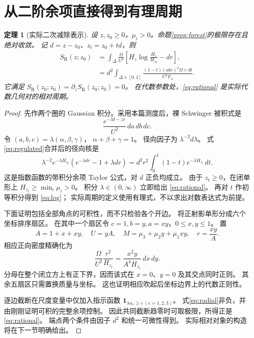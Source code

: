 \documentclass[11pt,a4paper]{ctexart}
\theoremstyle{cnplain}
\newtheorem{theorem}{定理}[section]
\theoremstyle{remark}\newtheorem{remark}[theorem]{注}
\newcommand{\SR}{S_{\mathrm R}}
\begin{document}
\section{从二阶余项直接得到有理周期}
\begin{theorem}[实际二次减除表示]\label{thm:period}
设 $z,z_0\geq0$，$\mu_i>0$。命题\ref{prop:forest}的极限存在且绝对收敛。
记 $d=z-z_0$、$z_t=z_0+td$，则
\begin{align}
 \SR(z;z_0)
 &=\int_\Delta\frac{\Omega}{U^2}
       \left[H_z\log\frac{H_z}{H_{z_0}}-d r\right],\label{eq:log}\\
 &=d^2\int_{\Delta\times[0,1]}
       \frac{(1-t)(abc)^2\Omega\wedge dt}{U^3F_{z_t}}.\label{eq:rational}
\end{align}
它满足 $\SR(z_0;z_0)=\partial_z\SR(z_0;z_0)=0$。
在代数参数处，\eqref{eq:rational} 是实际代数几何对的相对周期。
\end{theorem}
\begin{proof}
先作两个圈的 Gaussian 积分。采用本篇测度后，裸 Schwinger 被积式是
\[
 \frac{e^{-M-zr}}{U^2}\,da\,db\,dc.
\]
令 $(a,b,c)=\lambda(\alpha,\beta,\gamma)$，
$\alpha+\beta+\gamma=1$。
径向因子为 $\lambda^{-2}d\lambda$。
式\eqref{eq:regulated}合并后的径向核是
\begin{equation}\label{eq:radial}
 \lambda^{-2}e^{-\lambda H_{z_0}}
       \left(e^{-\lambda d r}-1+\lambda d r\right)
 =d^2r^2\int_0^1(1-t)e^{-\lambda H_{z_t}}\,dt.
\end{equation}
这是指数函数的带积分余项 Taylor 公式，对 $d$ 正负均成立。
由于 $z_t\geq0$，在闭单形上 $H_{z_t}\geq\min_i\mu_i>0$。
积分 $\lambda\in(0,\infty)$ 立即给出 \eqref{eq:rational}。
再对 $t$ 作初等积分得到 \eqref{eq:log}；
实际周期的定义使用有理式，不以求出对数表达式为前提。

下面证明包括全部角点的可积性，而不只检验各个开边。
将正射影单形分成六个坐标排序扇区。
在其中一个扇区令 $c=1,b=y,a=xy$，$0\leq x,y\leq1$。
置
\[
 A=1+x+xy,\quad U=yA,\quad
 M=\mu_3+\mu_2y+\mu_1xy,\quad r=\frac{xy}{A}.
\]
相应正向密度精确化为
\begin{equation}\label{eq:sector}
 \frac{\Omega}{U^2}\frac{r^2}{H_{z_t}}
   =\frac{x^2y}{A^4H_{z_t}}\,dx\,dy.
\end{equation}
分母在整个闭立方上有正下界，因而该式在 $x=0$、$y=0$ 及其交点同时正则。
其余五扇区只需置换质量与坐标。
这也证明相应吹起后坐标边界上的代数正则性。

逐边截断在尺度变量中仅加入指示函数
$\mathbf1_{\lambda\alpha_e\geq\varepsilon\ (e=1,2,3)}$。
式\eqref{eq:radial}非负，并由刚刚证明可积的完整余项控制。
因此共同截断趋零时可取极限，所得正是 \eqref{eq:rational}。
端点两个条件由因子 $d^2$ 和统一可微性得到。
实际相对对象的构造将在下一节明确给出。
\end{proof}
\end{document}
